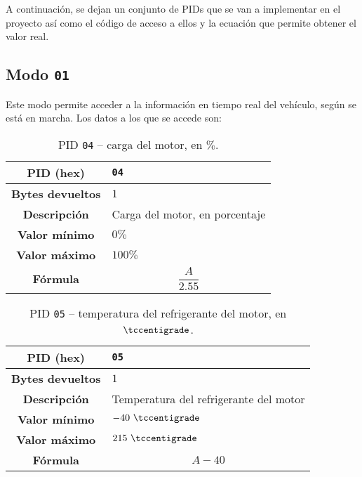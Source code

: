 A continuación, se dejan un conjunto de \ac{PID}s que se van a implementar en el
proyecto así como el código de acceso a ellos y la ecuación que permite obtener el
valor real.

\subsection*{Modo \texttt{01}}
Este modo permite acceder a la información en tiempo real del vehículo, según se
está en marcha. Los datos a los que se accede son:

\begin{table}[H]
  \centering
  \begin{tabularx}{\textwidth}{|c|X|}
    \hline
    \textbf{PID (hex)}       & \texttt{04}                    \\
    \hline
    \textbf{Bytes devueltos} & $1$                            \\
    \hline
    \textbf{Descripción}     & Carga del motor, en porcentaje \\
    \hline
    \textbf{Valor mínimo}    & $0\%$                          \\
    \hline
    \textbf{Valor máximo}    & $100\%$                        \\
    \hline
    \textbf{Fórmula}         &                                %
    \begin{equation*}
      \frac{A}{2.55}
    \end{equation*}                                 \\
    \hline
  \end{tabularx}
  \caption{\ac{PID} \texttt{04} -- carga del motor, en $\%$.}
\end{table}

\begin{table}[H]
  \centering
  \begin{tabularx}{\textwidth}{|c|X|}
    \hline
    \textbf{PID (hex)}       & \texttt{05}                            \\
    \hline
    \textbf{Bytes devueltos} & $1$                                    \\
    \hline
    \textbf{Descripción}     & Temperatura del refrigerante del motor \\
    \hline
    \textbf{Valor mínimo}    & $-40~\tccentigrade$                    \\
    \hline
    \textbf{Valor máximo}    & $215~\tccentigrade$                    \\
    \hline
    \textbf{Fórmula}         &                                        %
    \begin{equation*}
      A - 40
    \end{equation*}                                         \\
    \hline
  \end{tabularx}
  \caption{\ac{PID} \texttt{05} -- temperatura del refrigerante del motor, en $\tccentigrade$.}
\end{table}

